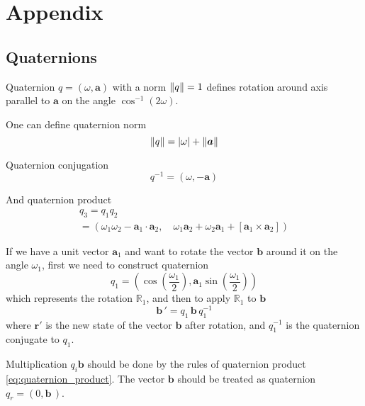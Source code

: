 \section{Appendix}
\subsection{Quaternions}

Quaternion $q = (\omega, \boldsymbol{a})$ with a norm $\left\lVert q\right\rVert = 1$ defines rotation around axis parallel to $\boldsymbol{a}$ on the angle $\cos^{-1}(2 \omega)$. 

One can define quaternion norm
\begin{equation}
\left\lVert q\right\rVert = |\omega| + \left\lVert\boldsymbol{a}\right\rVert
\end{equation}

Quaternion conjugation
\begin{equation}
q^{-1} = (\omega, -\boldsymbol{a})
\end{equation}

And quaternion product
\begin{multline}
\label{eq:quaternion_product}
q_3 = q_1 q_2 \\ = \left(\omega_1 \omega_2 - \boldsymbol{a}_1 \cdot \boldsymbol{a}_2, \quad \omega_1 \boldsymbol{a}_2 + \omega_2 \boldsymbol{a}_1 + [\boldsymbol{a}_1 \times \boldsymbol{a}_2] \right)
\end{multline}

If we have a unit vector $\boldsymbol{a}_1$ and want to rotate the vector $\boldsymbol{b}$  around it on the angle $\omega_1$, first we need to construct quaternion
\begin{equation}
q_1 = \left(
		\cos\left(\frac{\omega_1}{2}\right),
		\boldsymbol{a}_1 \sin\left(\frac{\omega_1}{2}\right)
	\right)
\end{equation}
which represents the rotation $\mathbb{R}_1$, and then to apply $\mathbb{R}_1$ to $\boldsymbol{b}$
\begin{equation}
\label{eq:quaternion_rotation}
	\boldsymbol{b}\,' = q_1\, \boldsymbol{b}\, q_1^{-1}
\end{equation}
where $\boldsymbol{r'}$ is the new state of the vector $\boldsymbol{b}$ after rotation, and $q_1^{-1}$ is the quaternion conjugate to $q_1$.

Multiplication $q_i \boldsymbol{b}$ should be done by the rules of quaternion product \eqref{eq:quaternion_product}. The vector $\boldsymbol{b}$ should be treated as quaternion $q_r = (0, \boldsymbol{b}\,)$.

